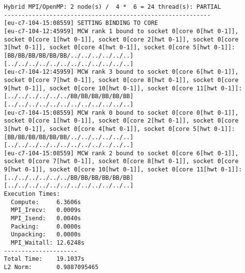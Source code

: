 \begin{lstlisting}[basicstyle=\tiny, frame=single, caption={Task 2: Collected Euler outputs.}, label={lst:1}]
Hybrid MPI/OpenMP: 2 node(s) /  4 *  6 = 24 thread(s): PARTIAL 
-----------------------------------------------------------
[eu-c7-104-15:08559] SETTING BINDING TO CORE
[eu-c7-104-12:45959] MCW rank 1 bound to socket 0[core 0[hwt 0-1]], socket 0[core 1[hwt 0-1]], socket 0[core 2[hwt 0-1]], socket 0[core 3[hwt 0-1]], socket 0[core 4[hwt 0-1]], socket 0[core 5[hwt 0-1]]: [BB/BB/BB/BB/BB/BB/../../../../../..][../../../../../../../../../../../..]
[eu-c7-104-12:45959] MCW rank 3 bound to socket 0[core 6[hwt 0-1]], socket 0[core 7[hwt 0-1]], socket 0[core 8[hwt 0-1]], socket 0[core 9[hwt 0-1]], socket 0[core 10[hwt 0-1]], socket 0[core 11[hwt 0-1]]: [../../../../../../BB/BB/BB/BB/BB/BB][../../../../../../../../../../../..]
[eu-c7-104-15:08559] MCW rank 0 bound to socket 0[core 0[hwt 0-1]], socket 0[core 1[hwt 0-1]], socket 0[core 2[hwt 0-1]], socket 0[core 3[hwt 0-1]], socket 0[core 4[hwt 0-1]], socket 0[core 5[hwt 0-1]]: [BB/BB/BB/BB/BB/BB/../../../../../..][../../../../../../../../../../../..]
[eu-c7-104-15:08559] MCW rank 2 bound to socket 0[core 6[hwt 0-1]], socket 0[core 7[hwt 0-1]], socket 0[core 8[hwt 0-1]], socket 0[core 9[hwt 0-1]], socket 0[core 10[hwt 0-1]], socket 0[core 11[hwt 0-1]]: [../../../../../../BB/BB/BB/BB/BB/BB][../../../../../../../../../../../..]
Execution Times:
  Compute:     6.3606s
  MPI_Irecv:   0.0009s
  MPI_Isend:   0.0040s
  Packing:     0.0000s
  Unpacking:   0.0000s
  MPI_Waitall: 12.6248s
---------------------
Total Time:    19.1037s
L2 Norm:       0.9887095465



\end{lstlisting}
